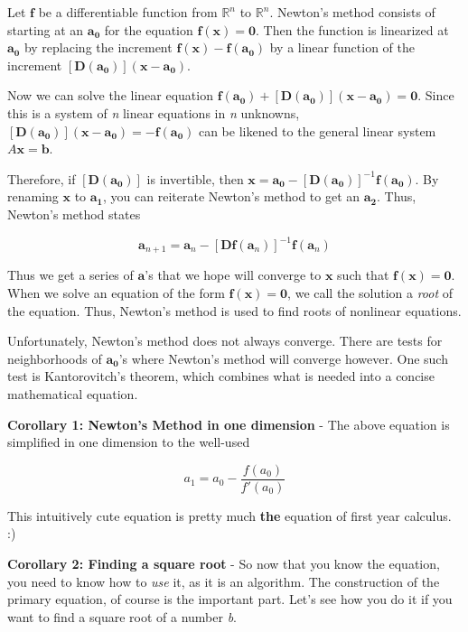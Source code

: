 \documentclass[12pt]{article}
\begin{document}
\newcommand{\fvec}{{\mathbf{f}}}
\newcommand{\xpt}{\mathbf{x}}
\newcommand{\dfa}{[\mathbf{D}(\mathbf{a_0})]}
\newcommand{\ao}{\mathbf{a_0}}
\newcommand{\ovec}{\mathbf{0}}
\newcommand{\xvec}{\mathbf{x}}
\newcommand{\bvec}{\mathbf{b}}

Let $\fvec$ be a differentiable function from $\mathbb{R}^n$ to $\mathbb{R}^n$.
Newton's method consists of starting at an $\ao$ for the equation $\fvec(\xpt)=\ovec$. Then the function is linearized at $\ao$ by replacing the increment $\fvec(\xpt)-\fvec(\ao)$ by a linear function of the increment $\dfa(\xpt-\ao)$.

Now we can solve the linear equation $\fvec(\ao)+\dfa(\xpt-\ao)=\ovec$.
Since this is a system of \emph{n} linear equations in \emph{n} unknowns, 
$\dfa(\xpt-\ao) = -\fvec(\ao)$ can be likened to the general linear system  $A\xvec=\bvec$.  

Therefore, if $\dfa$ is invertible, then $\xpt = \ao-\dfa^{-1}\fvec(\ao)$.
By renaming $\xpt$ to $\mathbf{a_1}$, you can reiterate Newton's method to get an $\mathbf{a_2}$. Thus, Newton's method states

$$\mathbf{a}_{n+1} = \mathbf{a}_n - [\mathbf{D}\fvec(\mathbf{a}_n)]^{-1}\fvec(\mathbf{a}_n)$$

Thus we get a series of $\mathbf{a}$'s that we hope will converge to $\xpt$ such that $\fvec(\xpt)=\ovec$.  When we solve an equation of the form $\fvec(\xpt) = \ovec$, we call the solution a \emph{root} of the equation. Thus, Newton's method is used to find roots of nonlinear equations.

Unfortunately, Newton's method does not always converge. There are tests for 
neighborhoods of $\ao$'s where Newton's method will converge however. One such test is Kantorovitch's theorem, which combines what is needed into a concise mathematical equation.

\textbf{Corollary 1: Newton's Method in one dimension} - The above equation is simplified in one dimension to the well-used 

$$a_1 = a_0 - \frac{f(a_0)}{f'(a_0)}$$ 

This intuitively cute equation is pretty much \textbf{the} equation of first year calculus. :)

\textbf{Corollary 2: Finding a square root} - So now that you know the equation, 
you need to know how to \emph{use} it, as it is an algorithm. The construction of the primary equation, of course is the important part. Let's see how you do it if you want to find a square root of a number \emph{b}.
\end{document}
